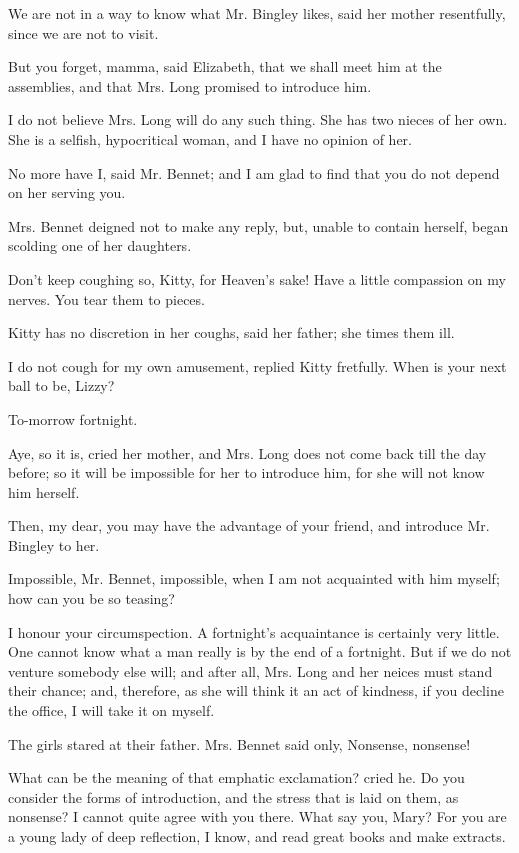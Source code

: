 \documentclass[twocolumn]{article}
\begin{document}
We are not in a way to know what Mr. Bingley likes, said her mother
resentfully, since we are not to visit.

But you forget, mamma, said Elizabeth, that we shall meet him at the
assemblies, and that Mrs. Long promised to introduce him.

I do not believe Mrs. Long will do any such thing. She has two nieces
of her own. She is a selfish, hypocritical woman, and I have no opinion
of her.

No more have I, said Mr. Bennet; and I am glad to find that you do
not depend on her serving you.

Mrs. Bennet deigned not to make any reply, but, unable to contain
herself, began scolding one of her daughters.

Don't keep coughing so, Kitty, for Heaven's sake! Have a little
compassion on my nerves. You tear them to pieces.

Kitty has no discretion in her coughs, said her father; she times
them ill.

I do not cough for my own amusement, replied Kitty fretfully. When is
your next ball to be, Lizzy?

To-morrow fortnight.

Aye, so it is, cried her mother, and Mrs. Long does not come back
till the day before; so it will be impossible for her to introduce him,
for she will not know him herself.

Then, my dear, you may have the advantage of your friend, and introduce
Mr. Bingley to her.

Impossible, Mr. Bennet, impossible, when I am not acquainted with him
myself; how can you be so teasing?

I honour your circumspection. A fortnight's acquaintance is certainly
very little. One cannot know what a man really is by the end of a
fortnight. But if we do not venture somebody else will; and after all,
Mrs. Long and her neices must stand their chance; and, therefore, as
she will think it an act of kindness, if you decline the office, I will
take it on myself.

The girls stared at their father. Mrs. Bennet said only, Nonsense,
nonsense!

What can be the meaning of that emphatic exclamation? cried he. Do
you consider the forms of introduction, and the stress that is laid on
them, as nonsense? I cannot quite agree with you there. What say you,
Mary? For you are a young lady of deep reflection, I know, and read
great books and make extracts.
\end{document}

